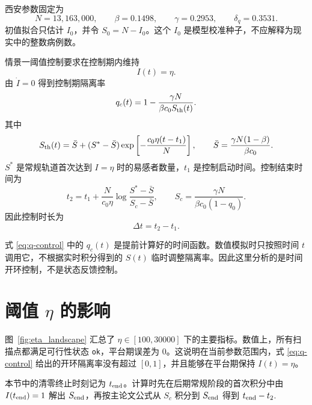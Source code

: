 \documentclass[cn,blue,14pt,normal]{elegantnote}
\numberwithin{equation}{section}
\begin{document}
西安参数固定为
\begin{equation}
  N=13{,}163{,}000,\qquad
  \beta=0.1498,\qquad
  \gamma=0.2953,\qquad
  \delta_q=0.3531.
\end{equation}
初值拟合只估计 $I_0$，并令 $S_0=N-I_0$。这个 $I_0$ 是模型校准种子，不应解释为现实中的整数病例数。

情景一阈值控制要求在控制期内维持
\begin{equation}
  I(t)=\eta.
\end{equation}
由 $\dot I=0$ 得到控制期隔离率
\begin{equation}
  q_c(t)
  =
  1-\frac{\gamma N}{\beta c_0 S_{\rm th}(t)}.
  \label{eq:q-control}
\end{equation}
其中
\begin{equation}
  S_{\rm th}(t)
  =
  \bar S+(S^*-\bar S)
  \exp\left[-\frac{c_0\eta(t-t_1)}{N}\right],
  \qquad
  \bar S=\frac{\gamma N(1-\beta)}{\beta c_0}.
  \label{eq:S-th}
\end{equation}
$S^*$ 是常规轨道首次达到 $I=\eta$ 时的易感者数量，$t_1$ 是控制启动时间。控制结束时间为
\begin{equation}
  t_2
  =
  t_1+
  \frac{N}{c_0\eta}
  \log\frac{S^*-\bar S}{S_c-\bar S},
  \qquad
  S_c=\frac{\gamma N}{\beta c_0(1-q_0)}.
  \label{eq:t2}
\end{equation}
因此控制时长为
\begin{equation}
  \Delta t=t_2-t_1.
\end{equation}

\begin{remark}
  式 \eqref{eq:q-control} 中的 $q_c(t)$ 是提前计算好的时间函数。数值模拟时只按照时间 $t$ 调用它，不根据实时积分得到的 $S(t)$ 临时调整隔离率。因此这里分析的是时间开环控制，不是状态反馈控制。
\end{remark}

\section{阈值 \texorpdfstring{$\eta$}{eta} 的影响}

图~\ref{fig:eta_landscape} 汇总了 $\eta\in[100,30000]$ 下的主要指标。数值上，所有扫描点都满足可行性状态 \texttt{ok}，平台期误差为 0。这说明在当前参数范围内，式 \eqref{eq:q-control} 给出的开环隔离率没有超过 $[0,1]$，并且能够在平台期保持 $I(t)=\eta$。

本节中的清零终止时刻记为 $t_{\rm end}$。计算时先在后期常规阶段的首次积分中由 $I(t_{\rm end})=1$ 解出 $S_{\rm end}$，再按主论文公式从 $S_c$ 积分到 $S_{\rm end}$ 得到 $t_{\rm end}-t_2$.
\end{document}
